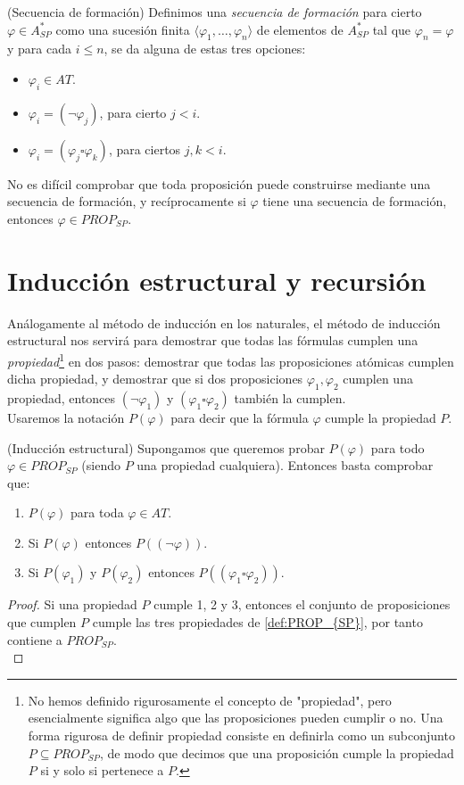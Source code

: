 \begin{definition}(Secuencia de formación)
Definimos una \textit{secuencia de formación} para cierto $\varphi\in A_{SP}^*$ como una sucesión finita $\langle\varphi_1,\dots,\varphi_n\rangle$ de elementos de $A_{SP}^*$ tal que $\varphi_n=\varphi$ y para cada $i\leq n$, se da alguna de estas tres opciones:
\begin{itemize}
    \item $\varphi_i\in AT$.
    \item $\varphi_i=(\neg \varphi_j)$, para cierto $j<i$.
    \item $\varphi_i=(\varphi_j\square\varphi_k)$, para ciertos $j,k<i$.
\end{itemize}
\end{definition}

No es difícil comprobar que toda proposición puede construirse mediante una secuencia de formación, y recíprocamente si $\varphi$ tiene una secuencia de formación, entonces $\varphi\in PROP_{SP}$.

\section{Inducción estructural y recursión}

Análogamente al método de inducción en los naturales, el método de inducción estructural nos servirá para demostrar que todas las fórmulas cumplen una \textit{propiedad}\footnote{No hemos definido rigurosamente el concepto de "propiedad", pero esencialmente significa algo que las proposiciones pueden cumplir o no. Una forma rigurosa de definir propiedad consiste en definirla como un subconjunto $P\subseteq PROP_{SP}$, de modo que decimos que una proposición cumple la propiedad $P$ si y solo si pertenece a $P$.} en dos pasos: demostrar que todas las proposiciones atómicas cumplen dicha propiedad, y demostrar que si dos proposiciones $\varphi_1,\varphi_2$ cumplen una propiedad, entonces $(\neg\varphi_1)$ y $(\varphi_1\square\varphi_2)$ también la cumplen.\\

Usaremos la notación $P(\varphi)$ para decir que la fórmula $\varphi$ cumple la propiedad $P$.

\begin{prop}\label{indest} (Inducción estructural) Supongamos que queremos probar $P(\varphi)$ para todo $\varphi\in PROP_{SP}$ (siendo $P$ una propiedad cualquiera). Entonces basta comprobar que:
\begin{enumerate}
    \item $P(\varphi)$ para toda $\varphi\in AT$.
    \item Si $P(\varphi)$ entonces $P((\neg \varphi))$.
    \item Si $P(\varphi_1)$ y $P(\varphi_2)$ entonces $P((\varphi_1 \square \varphi_2))$.
\end{enumerate}
\begin{proof}
Si una propiedad $P$ cumple 1, 2 y 3, entonces el conjunto de proposiciones que cumplen $P$ cumple las tres propiedades de \ref{def:PROP_{SP}}, por tanto contiene a $PROP_{SP}$. \\
\end{proof}
\end{prop}

